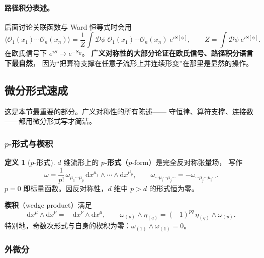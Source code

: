 \documentclass[UTF8,a4paper,11pt]{ctexart}
\theoremstyle{plain}
\theoremstyle{definition}
\newtheorem{definition}{定义}[section]
\theoremstyle{remark}
\newcommand{\ext}{\mathrm{d}}          %
\newcommand{\Op}{\mathcal{O}}
\newcommand{\en}[1]{\textsf{#1}}       %
\newcommand{\Dop}{\mathcal{D}}
\begin{document}
\paragraph{路径积分表述。}后面讨论关联函数与 Ward 恒等式时会用
\begin{equation}
  \big\langle \Op_1(x_1)\cdots\Op_n(x_n)\big\rangle
  =\frac{1}{Z}\int\!\Dop\phi\;
  \Op_1(x_1)\cdots\Op_n(x_n)\;e^{iS[\phi]},
  \qquad
  Z=\int\!\Dop\phi\;e^{iS[\phi]} .
  \label{eq:pathintegral}
\end{equation}
在欧氏信号下 $e^{iS}\to e^{-S_E}$。
\textbf{广义对称性的大部分论证在欧氏信号、路径积分语言下最自然}，
因为“把算符支撑在任意子流形上并连续形变”在那里是显然的操作。

\subsection{微分形式速成}
\label{subsec:forms}

这是本节最重要的部分。广义对称性的所有陈述——
守恒律、算符支撑、连接数——都用微分形式写才简洁。

\subsubsection{\texorpdfstring{$p$}{p}-形式与楔积}

\begin{definition}[$p$-形式]
$d$ 维流形上的 \textbf{$p$-形式}（\en{$p$-form}）是完全反对称张量场，
写作
\begin{equation}
  \omega=\frac{1}{p!}\,\omega_{\mu_1\cdots\mu_p}\,
  \ext x^{\mu_1}\wedge\cdots\wedge\ext x^{\mu_p},
  \qquad
  \omega_{\cdots\mu_i\cdots\mu_j\cdots}=-\omega_{\cdots\mu_j\cdots\mu_i\cdots} .
\end{equation}
$p=0$ 即标量函数。因反对称性，$d$ 维中 $p>d$ 的形式恒为零。
\end{definition}

\textbf{楔积}（\en{wedge product}）满足
\begin{equation}
  \ext x^\mu\wedge \ext x^\nu=-\,\ext x^\nu\wedge \ext x^\mu,
  \qquad
  \omega_{(p)}\wedge\eta_{(q)}=(-1)^{pq}\,\eta_{(q)}\wedge\omega_{(p)} .
  \label{eq:wedge}
\end{equation}
特别地，奇数次形式与自身的楔积为零：$\omega_{(1)}\wedge\omega_{(1)}=0$。

\subsubsection{外微分}
\end{document}
